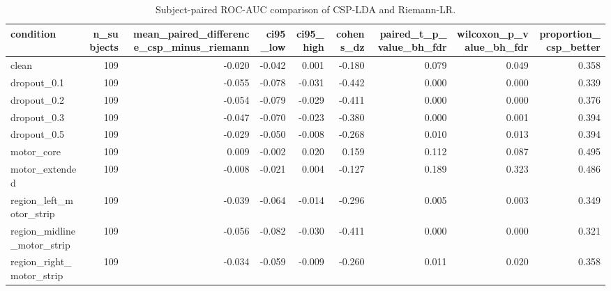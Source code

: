 \begin{table}
\caption{Subject-paired ROC-AUC comparison of CSP-LDA and Riemann-LR.}
\label{tab:pipeline-comparison}
\begin{tabular}{lrrrrrrrr}
\toprule
condition & n\_subjects & mean\_paired\_difference\_csp\_minus\_riemann & ci95\_low & ci95\_high & cohens\_dz & paired\_t\_p\_value\_bh\_fdr & wilcoxon\_p\_value\_bh\_fdr & proportion\_csp\_better \\
\midrule
clean & 109 & -0.020 & -0.042 & 0.001 & -0.180 & 0.079 & 0.049 & 0.358 \\
dropout\_0.1 & 109 & -0.055 & -0.078 & -0.031 & -0.442 & 0.000 & 0.000 & 0.339 \\
dropout\_0.2 & 109 & -0.054 & -0.079 & -0.029 & -0.411 & 0.000 & 0.000 & 0.376 \\
dropout\_0.3 & 109 & -0.047 & -0.070 & -0.023 & -0.380 & 0.000 & 0.001 & 0.394 \\
dropout\_0.5 & 109 & -0.029 & -0.050 & -0.008 & -0.268 & 0.010 & 0.013 & 0.394 \\
motor\_core & 109 & 0.009 & -0.002 & 0.020 & 0.159 & 0.112 & 0.087 & 0.495 \\
motor\_extended & 109 & -0.008 & -0.021 & 0.004 & -0.127 & 0.189 & 0.323 & 0.486 \\
region\_left\_motor\_strip & 109 & -0.039 & -0.064 & -0.014 & -0.296 & 0.005 & 0.003 & 0.349 \\
region\_midline\_motor\_strip & 109 & -0.056 & -0.082 & -0.030 & -0.411 & 0.000 & 0.000 & 0.321 \\
region\_right\_motor\_strip & 109 & -0.034 & -0.059 & -0.009 & -0.260 & 0.011 & 0.020 & 0.358 \\
\bottomrule
\end{tabular}
\end{table}
